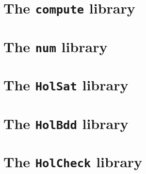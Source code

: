\section{The \texttt{compute} library}
\label{sec:computeLib}

\section{The {\tt num} library}
\label{sec:numLib}

\section{The \texttt{HolSat} library}\label{sec:HolSatLib}
\section{The \texttt{HolBdd} library}\label{sec:HolBddLib}
\section{The \texttt{HolCheck} library}\label{sec:HolCheckLib}


